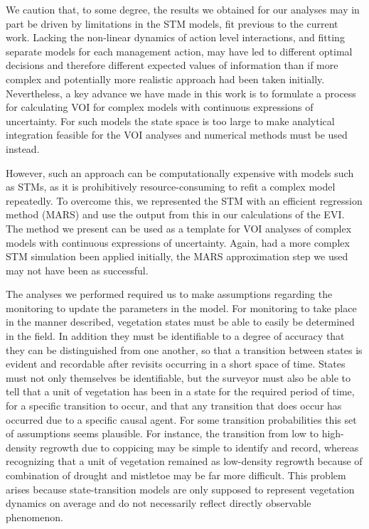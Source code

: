 \documentclass[draft]{article}
\theoremstyle{definition}
\theoremstyle{definition}
\theoremstyle{definition}
\theoremstyle{remark}
\begin{document}
We caution that, to some degree, the results we obtained for our
analyses may in part be driven by limitations in the STM models, fit
previous to the current work. Lacking the non-linear dynamics of action
level interactions, and fitting separate models for each management
action, may have led to different optimal decisions and therefore
different expected values of information than if more complex and
potentially more realistic approach had been taken initially.
Nevertheless, a key advance we have made in this work is to formulate a
process for calculating VOI for complex models with continuous
expressions of uncertainty. For such models the state space is too large
to make analytical integration feasible for the VOI analyses and
numerical methods must be used instead.

However, such an approach can be computationally expensive with models
such as STMs, as it is prohibitively resource-consuming to refit a
complex model repeatedly. To overcome this, we represented the STM with
an efficient regression method (MARS) and use the output from this in
our calculations of the EVI. The method we present can be used as a
template for VOI analyses of complex models with continuous expressions
of uncertainty. Again, had a more complex STM simulation been applied
initially, the MARS approximation step we used may not have been as
successful.

The analyses we performed required us to make assumptions regarding the
monitoring to update the parameters in the model. For monitoring to take
place in the manner described, vegetation states must be able to easily
be determined in the field. In addition they must be identifiable to a
degree of accuracy that they can be distinguished from one another, so
that a transition between states is evident and recordable after
revisits occurring in a short space of time. States must not only
themselves be identifiable, but the surveyor must also be able to tell
that a unit of vegetation has been in a state for the required period of
time, for a specific transition to occur, and that any transition that
does occur has occurred due to a specific causal agent. For some
transition probabilities this set of assumptions seems plausible. For
instance, the transition from low to high-density regrowth due to
coppicing may be simple to identify and record, whereas recognizing that
a unit of vegetation remained as low-density regrowth because of
combination of drought and mistletoe may be far more difficult. This
problem arises because state-transition models are only supposed to
represent vegetation dynamics on average and do not necessarily reflect
directly observable phenomenon.
\end{document}
